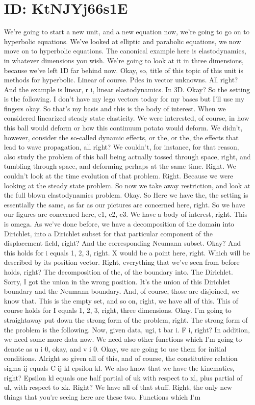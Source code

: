 \documentclass[10pt]{article}
\begin{document}
\section*{ID: KtNJYj66s1E}
We're going to start a new unit, and a new equation now, we're going to go on to hyperbolic equations. We've looked at elliptic and parabolic equations, we now move on to hyperbolic equations. The canonical example here is elastodynamics, in whatever dimensions you wish. We're going to look at it in three dimensions, because we've left 1D far behind now. Okay, so, title of this topic of this unit is methods for hyperbolic. Linear of course. Pdes in vector unknowns. All right? And the example is linear, r i, linear elastodynamics. In 3D. Okay? So the setting is the following. I don't have my lego vectors today for my bases but I'll use my fingers okay. So that's my basis and this is the body of interest. When we considered linearized steady state elasticity. We were interested, of course, in how this ball would deform or how this continuum potato would deform. We didn't, however, consider the so-called dynamic effects, or the, or the, the effects that lead to wave propagation, all right? We couldn't, for instance, for that reason, also study the problem of this ball being actually tossed through space, right, and tumbling through space, and deforming perhaps at the same time. Right. We couldn't look at the time evolution of that problem. Right. Because we were looking at the steady state problem. So now we take away restriction, and look at the full blown elastodynamics problem. Okay. So Here we have the, the setting is essentially the same, as far as our pictures are concerned here, right. So we have our figures are concerned here, e1, e2, e3. We have a body of interest, right. This is omega. As we've done before, we have a decomposition of the domain into Dirichlet, into a Dirichlet subset for that particular component of the displacement field, right? And the corresponding Neumann subset. Okay? And this holds for i equals 1, 2, 3, right. X would be a point here, right. Which will be described by its position vector. Right, everything that we've seen from before holds, right? The decomposition of the, of the boundary into. The Dirichlet. Sorry, I got the union in the wrong position. It's the union of this Dirichlet boundary and the Neumann boundary. And, of course, those are disjoined, we know that. This is the empty set, and so on, right, we have all of this. This of course holds for I equals 1, 2, 3, right, three dimensions. Okay. I'm going to straightaway put down the strong form of the problem, right. The strong form of the problem is the following. Now, given data, ugi, t bar i. F i, right? In addition, we need some more data now. We need also other functions which I'm going to denote as u i 0, okay, and v i 0. Okay, we are going to use them for initial conditions. Alright so given all of this, and of course, the constitutive relation sigma ij equals C ij kl epsilon kl. We also know that we have the kinematics, right? Epsilon kl equals one half partial of uk with respect to xl, plus partial of ul, with respect to xk. Right? We have all of that stuff. Right, the only new things that you're seeing here are these two. Functions which I'm 
\end{document}
